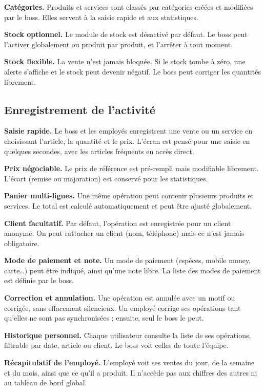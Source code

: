 \documentclass[11pt,a4paper]{article}
\newcommand{\fonc}[2]{\textbf{#1.} #2\par\vspace{0.2em}}
\begin{document}
	\fonc{Catégories}{Produits et services sont classés par catégories créées et modifiées par le boss. Elles servent à la saisie rapide et aux statistiques.}
	
	\fonc{Stock optionnel}{Le module de stock est désactivé par défaut. Le boss peut l'activer globalement ou produit par produit, et l'arrêter à tout moment.}
	
	\fonc{Stock flexible}{La vente n'est jamais bloquée. Si le stock tombe à zéro, une alerte s'affiche et le stock peut devenir négatif. Le boss peut corriger les quantités librement.}
	
	\subsection{Enregistrement de l'activité}
	
	\fonc{Saisie rapide}{Le boss et les employés enregistrent une vente ou un service en choisissant l'article, la quantité et le prix. L'écran est pensé pour une saisie en quelques secondes, avec les articles fréquents en accès direct.}
	
	\fonc{Prix négociable}{Le prix de référence est pré-rempli mais modifiable librement. L'écart (remise ou majoration) est conservé pour les statistiques.}
	
	\fonc{Panier multi-lignes}{Une même opération peut contenir plusieurs produits et services. Le total est calculé automatiquement et peut être ajusté globalement.}
	
	\fonc{Client facultatif}{Par défaut, l'opération est enregistrée pour un client anonyme. On peut rattacher un client (nom, téléphone) mais ce n'est jamais obligatoire.}
	
	\fonc{Mode de paiement et note}{Un mode de paiement (espèces, mobile money, carte\dots) peut être indiqué, ainsi qu'une note libre. La liste des modes de paiement est définie par le boss.}
	
	\fonc{Correction et annulation}{Une opération est annulée avec un motif ou corrigée, sans effacement silencieux. Un employé corrige ses opérations tant qu'elles ne sont pas synchronisées ; ensuite, seul le boss le peut.}
	
	\fonc{Historique personnel}{Chaque utilisateur consulte la liste de ses opérations, filtrable par date, article ou client. Le boss voit celles de toute l'équipe.}
	
	\fonc{Récapitulatif de l'employé}{L'employé voit ses ventes du jour, de la semaine et du mois, ainsi que ce qu'il a produit. Il n'accède pas aux chiffres des autres ni au tableau de bord global.}
	
\end{document}
